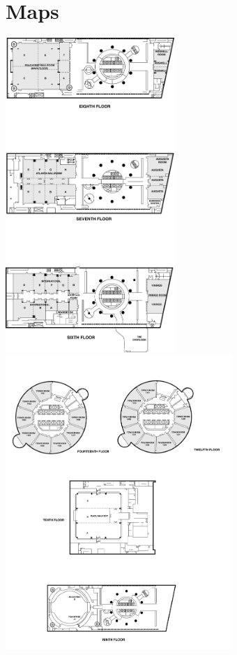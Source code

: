 \chapter{Maps}
\thispagestyle{emptyheader}
\vspace{-3em}
\sloppy
\setlength{\parindent}{0in}
\setlength{\parskip}{2ex}
\renewcommand{\baselinestretch}{0.87}

\begin{center}
\includegraphics[height=450px]{content/map1.png}
\includegraphics[height=420px]{content/map2.png}
\end{center}
